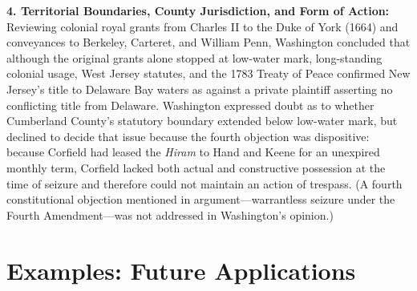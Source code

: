 \documentclass[12pt]{article}
\begin{document}
\textbf{4. Territorial Boundaries, County Jurisdiction, and Form of Action:} Reviewing colonial royal grants from Charles II to the Duke of York (1664) and conveyances to Berkeley, Carteret, and William Penn, Washington concluded that although the original grants alone stopped at low-water mark, long-standing colonial usage, West Jersey statutes, and the 1783 Treaty of Peace confirmed New Jersey's title to Delaware Bay waters as against a private plaintiff asserting no conflicting title from Delaware. Washington expressed doubt as to whether Cumberland County's statutory boundary extended below low-water mark, but declined to decide that issue because the fourth objection was dispositive: because Corfield had leased the \textit{Hiram} to Hand and Keene for an unexpired monthly term, Corfield lacked both actual and constructive possession at the time of seizure and therefore could not maintain an action of trespass. (A fourth constitutional objection mentioned in argument---warrantless seizure under the Fourth Amendment---was not addressed in Washington's opinion.)

\section{Examples: Future Applications}
\end{document}
